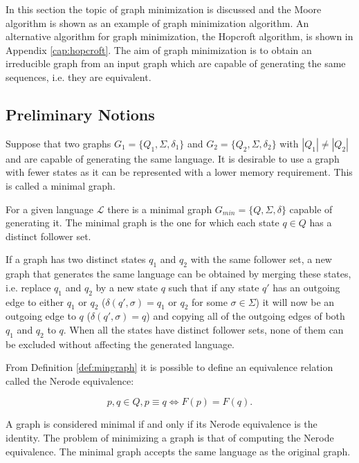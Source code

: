 {In this section the topic of graph minimization is discussed and the Moore algorithm is shown as an example of graph minimization algorithm. An alternative algorithm for graph minimization, the Hopcroft algorithm, is shown in Appendix \ref{cap:hopcroft}. The aim of graph minimization is to obtain an irreducible graph from an input graph which are capable of generating the same sequences, i.e. they are equivalent.

\subsection{Preliminary Notions}

Suppose that two graphs $G_1 = \{Q_1, \Sigma, \delta_1\}$ and $G_2 = \{Q_2, \Sigma, \delta_2\}$ with $|Q_1|\neq |Q_2|$ and are capable of generating the same language. It is desirable to use a graph with fewer states as it can be represented with a lower memory requirement. This is called a minimal graph. 

\begin{definition}\label{def:mingraph}
For a given language $\mathcal{L}$ there is a minimal graph $G_{min} = \{Q,\Sigma ,\delta \}$ capable of generating it. The minimal graph is the one for which each state $q \in Q$ has a distinct follower set.
\end{definition}

If a graph has two distinct states $q_1$ and $q_2$ with the same follower set, a new graph that generates the same language can be obtained by merging these states, i.e. replace $q_1$ and $q_2$ by a new state $q$ such that if any state $q\prime$ has an outgoing edge to either $q_1$ or $q_2$ ($\delta(q\prime,\sigma) = q_1$ or $q_2$ for some $\sigma\in\Sigma$) it will now be an outgoing edge to $q$ ($\delta(q\prime,\sigma) = q$) and copying all of the outgoing edges of both $q_1$ and $q_2$ to $q$. When all the states have distinct follower sets, none of them can be excluded without affecting the generated language.

From Definition \ref{def:mingraph} it is possible to define an equivalence relation called the Nerode equivalence:

\[
p, q \in Q, p \equiv q \Leftrightarrow F(p) = F(q).
\]

\noindent A graph is considered minimal if and only if its Nerode equivalence is the identity. The problem of minimizing a graph is that of computing the Nerode equivalence. The minimal graph accepts the same language as the original graph.


}

